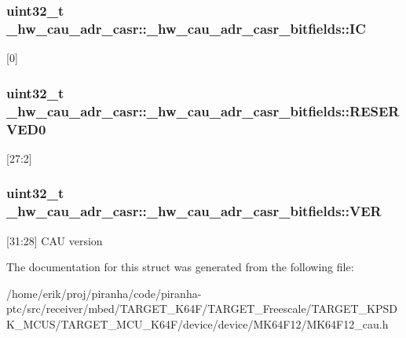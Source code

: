 \subsubsection[{\texorpdfstring{IC}{IC}}]{\setlength{\rightskip}{0pt plus 5cm}uint32\+\_\+t \+\_\+hw\+\_\+cau\+\_\+adr\+\_\+casr\+::\+\_\+hw\+\_\+cau\+\_\+adr\+\_\+casr\+\_\+bitfields\+::\+IC}\hypertarget{struct__hw__cau__adr__casr_1_1__hw__cau__adr__casr__bitfields_a8332eeb32944fc514118fad663e15dc0}{}\label{struct__hw__cau__adr__casr_1_1__hw__cau__adr__casr__bitfields_a8332eeb32944fc514118fad663e15dc0}
\mbox{[}0\mbox{]} 
\subsubsection[{\texorpdfstring{R\+E\+S\+E\+R\+V\+E\+D0}{RESERVED0}}]{\setlength{\rightskip}{0pt plus 5cm}uint32\+\_\+t \+\_\+hw\+\_\+cau\+\_\+adr\+\_\+casr\+::\+\_\+hw\+\_\+cau\+\_\+adr\+\_\+casr\+\_\+bitfields\+::\+R\+E\+S\+E\+R\+V\+E\+D0}\hypertarget{struct__hw__cau__adr__casr_1_1__hw__cau__adr__casr__bitfields_a60cbe587a41e81559dbd2b4a1d0eb969}{}\label{struct__hw__cau__adr__casr_1_1__hw__cau__adr__casr__bitfields_a60cbe587a41e81559dbd2b4a1d0eb969}
\mbox{[}27\+:2\mbox{]} 
\subsubsection[{\texorpdfstring{V\+ER}{VER}}]{\setlength{\rightskip}{0pt plus 5cm}uint32\+\_\+t \+\_\+hw\+\_\+cau\+\_\+adr\+\_\+casr\+::\+\_\+hw\+\_\+cau\+\_\+adr\+\_\+casr\+\_\+bitfields\+::\+V\+ER}\hypertarget{struct__hw__cau__adr__casr_1_1__hw__cau__adr__casr__bitfields_add6a5d2579b4ab1d9ba3ce331142d638}{}\label{struct__hw__cau__adr__casr_1_1__hw__cau__adr__casr__bitfields_add6a5d2579b4ab1d9ba3ce331142d638}
\mbox{[}31\+:28\mbox{]} C\+AU version 

The documentation for this struct was generated from the following file\+:\begin{DoxyCompactItemize}
\item 
/home/erik/proj/piranha/code/piranha-\/ptc/src/receiver/mbed/\+T\+A\+R\+G\+E\+T\+\_\+\+K64\+F/\+T\+A\+R\+G\+E\+T\+\_\+\+Freescale/\+T\+A\+R\+G\+E\+T\+\_\+\+K\+P\+S\+D\+K\+\_\+\+M\+C\+U\+S/\+T\+A\+R\+G\+E\+T\+\_\+\+M\+C\+U\+\_\+\+K64\+F/device/device/\+M\+K64\+F12/M\+K64\+F12\+\_\+cau.\+h\end{DoxyCompactItemize}
